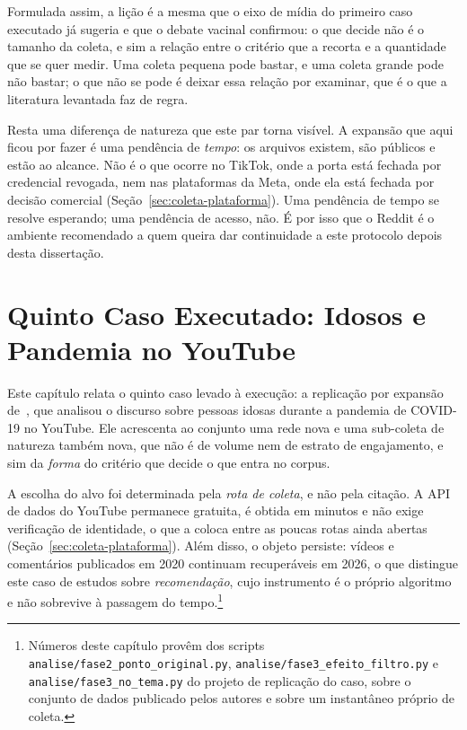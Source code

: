 Formulada assim, a lição é a mesma que o eixo de mídia do primeiro caso executado já
sugeria e que o debate vacinal confirmou: o que decide não é o tamanho da coleta, e sim
a relação entre o critério que a recorta e a quantidade que se quer medir. Uma coleta
pequena pode bastar, e uma coleta grande pode não bastar; o que não se pode é deixar
essa relação por examinar, que é o que a literatura levantada faz de regra.

Resta uma diferença de natureza que este par torna visível. A expansão que aqui ficou
por fazer é uma pendência de \emph{tempo}: os arquivos existem, são públicos e estão ao
alcance. Não é o que ocorre no TikTok, onde a porta está fechada por credencial
revogada, nem nas plataformas da Meta, onde ela está fechada por decisão comercial
(Seção~\ref{sec:coleta-plataforma}). Uma pendência de tempo se resolve esperando; uma
pendência de acesso, não. É por isso que o Reddit é o ambiente recomendado a quem queira
dar continuidade a este protocolo depois desta dissertação.

\chapter{Quinto Caso Executado: Idosos e Pandemia no YouTube}
\label{cap:caso-youtube}

Este capítulo relata o quinto caso levado à execução: a replicação por expansão de~, que analisou
o discurso sobre pessoas idosas durante a pandemia de COVID-19 no YouTube. Ele
acrescenta ao conjunto uma rede nova e uma sub-coleta de natureza também nova, que
não é de volume nem de estrato de engajamento, e sim da \emph{forma} do critério que
decide o que entra no corpus.

A escolha do alvo foi determinada pela \emph{rota de coleta}, e não pela citação. A
API de dados do YouTube permanece gratuita, é obtida em minutos e não exige
verificação de identidade, o que a coloca entre as poucas rotas ainda abertas
(Seção~\ref{sec:coleta-plataforma}). Além disso, o objeto persiste: vídeos e
comentários publicados em 2020 continuam recuperáveis em 2026, o que distingue este
caso de estudos sobre \emph{recomendação}, cujo instrumento é o próprio algoritmo e
não sobrevive à passagem do tempo.\footnote{Números deste capítulo provêm dos scripts
\texttt{analise/fase2\_ponto\_original.py}, \texttt{analise/fase3\_efeito\_filtro.py}
e \texttt{analise/fase3\_no\_tema.py} do projeto de replicação do caso, sobre o conjunto
de dados publicado pelos autores e sobre um instantâneo próprio de coleta.}


